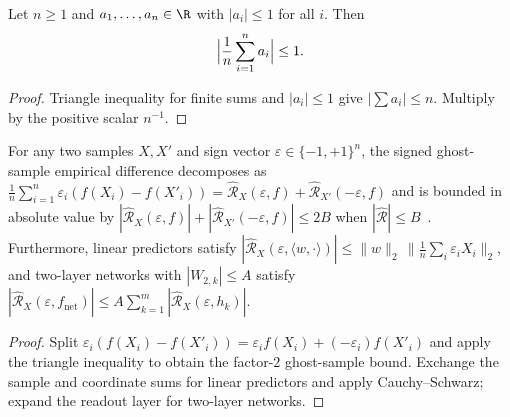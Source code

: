 \begin{lemma}\label{lem:bounded_mean}
\leanok
Let $n\ge 1$ and $a_1,\dots,a_n\in\R$ with $|a_i|\le 1$ for all $i$. Then
\[
\Bigl|\frac1n\sum_{i=1}^n a_i\Bigr| \le 1.
\]
\end{lemma}
\begin{proof}
\leanok
Triangle inequality for finite sums and $|a_i|\le 1$ give $\bigl|\sum a_i\bigr|\le n$. Multiply by the positive scalar $n^{-1}$.
\end{proof}

\begin{lemma}\label{lem:rademacher_bound}
\leanok
{}
For any two samples $X, X'$ and sign vector $\varepsilon\in\{-1,+1\}^n$, the signed ghost-sample empirical difference decomposes as $\frac{1}{n}\sum_{i=1}^n \varepsilon_i(f(X_i)-f(X'_i)) = \widehat{\mathcal{R}}_X(\varepsilon,f) + \widehat{\mathcal{R}}_{X'}(-\varepsilon,f)$ and is bounded in absolute value by $|\widehat{\mathcal{R}}_X(\varepsilon,f)| + |\widehat{\mathcal{R}}_{X'}(-\varepsilon,f)| \le 2 B$ when $|\widehat{\mathcal{R}}|\le B$~\cite{bartlett2002rademacher}. Furthermore, linear predictors satisfy $|\widehat{\mathcal{R}}_X(\varepsilon, \langle w,\cdot\rangle)| \le \|w\|_2\,\|\frac{1}{n}\sum_i \varepsilon_i X_i\|_2$, and two-layer networks with $|W_{2,k}|\le A$ satisfy $|\widehat{\mathcal{R}}_X(\varepsilon, f_{\mathrm{net}})| \le A\sum_{k=1}^m |\widehat{\mathcal{R}}_X(\varepsilon, h_k)|$.
\end{lemma}
\begin{proof}
\leanok
Split $\varepsilon_i(f(X_i)-f(X'_i)) = \varepsilon_i f(X_i) + (-\varepsilon_i)f(X'_i)$ and apply the triangle inequality to obtain the factor-$2$ ghost-sample bound. Exchange the sample and coordinate sums for linear predictors and apply Cauchy--Schwarz; expand the readout layer for two-layer networks.
\end{proof}

